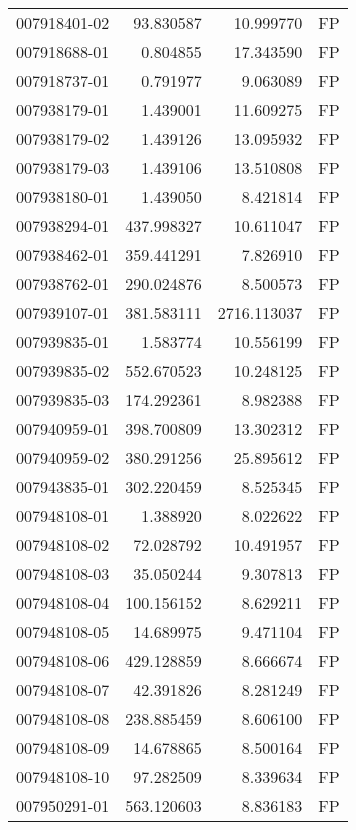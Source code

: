 \begin{tabular}{lrrl}
007918401-02 &   93.830587 &      10.999770 &   FP \\
007918688-01 &    0.804855 &      17.343590 &   FP \\
007918737-01 &    0.791977 &       9.063089 &   FP \\
007938179-01 &    1.439001 &      11.609275 &   FP \\
007938179-02 &    1.439126 &      13.095932 &   FP \\
007938179-03 &    1.439106 &      13.510808 &   FP \\
007938180-01 &    1.439050 &       8.421814 &   FP \\
007938294-01 &  437.998327 &      10.611047 &   FP \\
007938462-01 &  359.441291 &       7.826910 &   FP \\
007938762-01 &  290.024876 &       8.500573 &   FP \\
007939107-01 &  381.583111 &    2716.113037 &   FP \\
007939835-01 &    1.583774 &      10.556199 &   FP \\
007939835-02 &  552.670523 &      10.248125 &   FP \\
007939835-03 &  174.292361 &       8.982388 &   FP \\
007940959-01 &  398.700809 &      13.302312 &   FP \\
007940959-02 &  380.291256 &      25.895612 &   FP \\
007943835-01 &  302.220459 &       8.525345 &   FP \\
007948108-01 &    1.388920 &       8.022622 &   FP \\
007948108-02 &   72.028792 &      10.491957 &   FP \\
007948108-03 &   35.050244 &       9.307813 &   FP \\
007948108-04 &  100.156152 &       8.629211 &   FP \\
007948108-05 &   14.689975 &       9.471104 &   FP \\
007948108-06 &  429.128859 &       8.666674 &   FP \\
007948108-07 &   42.391826 &       8.281249 &   FP \\
007948108-08 &  238.885459 &       8.606100 &   FP \\
007948108-09 &   14.678865 &       8.500164 &   FP \\
007948108-10 &   97.282509 &       8.339634 &   FP \\
007950291-01 &  563.120603 &       8.836183 &   FP \\

\end{tabular}
